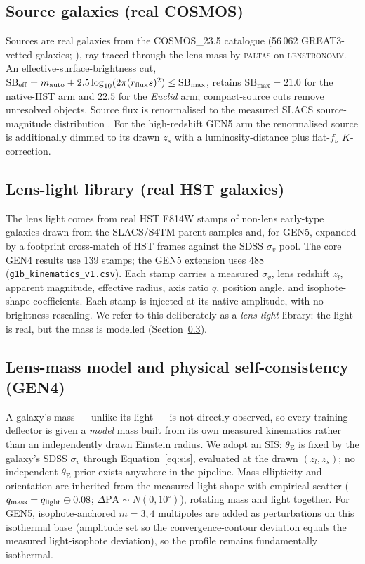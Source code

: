 \documentclass[fleqn,usenatbib]{mnras}
\newcommand{\thetaE}{\theta_{\mathrm{E}}}
\newcommand{\sigmav}{\sigma_{v}}
\begin{document}
\subsection{Source galaxies (real COSMOS)}
Sources are real galaxies from the COSMOS\_23.5 catalogue (56\,062
GREAT3-vetted galaxies; \citealt{Mandelbaum2012}), ray-traced through the lens
mass by \textsc{paltas} \citep{WagnerCarena2023} on \textsc{lenstronomy}. An
effective-surface-brightness cut,
$\mathrm{SB_{eff}} = m_{\rm auto} + 2.5\log_{10}(2\pi (r_{\rm flux} s)^2) \le
\mathrm{SB_{max}}$, retains $\mathrm{SB_{max}}=21.0$ for the native-HST arm and
$22.5$ for the \textit{Euclid} arm; compact-source cuts remove unresolved
objects. Source flux is renormalised to the measured SLACS source-magnitude
distribution \citep[mean ${\approx}24.3$ at $z{\approx}0.65$;][]{Newton2011}.
For the high-redshift GEN5 arm the renormalised source is additionally dimmed to
its drawn $z_s$ with a luminosity-distance plus flat-$f_\nu$ $K$-correction.

\subsection{Lens-light library (real HST galaxies)}
\label{sec:library}
The lens light comes from real HST F814W stamps of non-lens early-type galaxies
drawn from the SLACS/S4TM parent samples and, for GEN5, expanded by a
footprint cross-match of HST frames against the SDSS $\sigmav$ pool. The core
GEN4 results use 139 stamps; the GEN5 extension uses 488
(\texttt{g1b\_kinematics\_v1.csv}). Each stamp carries a measured $\sigmav$,
lens redshift $z_l$, apparent magnitude, effective radius, axis ratio $q$,
position angle, and isophote-shape coefficients. Each stamp is injected at its
native amplitude, with no brightness rescaling. We refer to this deliberately as
a \emph{lens-light} library: the light is real, but the mass is modelled
(Section~\ref{sec:massmodel}).

\subsection{Lens-mass model and physical self-consistency (GEN4)}
\label{sec:massmodel}
A galaxy's mass --- unlike its light --- is not directly observed, so every
training deflector is given a \emph{model} mass built from its own measured
kinematics rather than an independently drawn Einstein radius. We adopt an SIS:
$\thetaE$ is fixed by the galaxy's SDSS $\sigmav$ through
Equation~\ref{eq:sis}, evaluated at the drawn $(z_l,z_s)$; no independent
$\thetaE$ prior exists anywhere in the pipeline. Mass ellipticity and
orientation are inherited from the measured light shape with empirical scatter
($q_{\rm mass}=q_{\rm light}\oplus0.08$; $\Delta\mathrm{PA}\sim N(0,10^\circ)$),
rotating mass and light together. For GEN5, isophote-anchored $m=3,4$ multipoles
are added as perturbations on this isothermal base (amplitude set so the
convergence-contour deviation equals the measured light-isophote deviation), so
the profile remains fundamentally isothermal.
\end{document}
